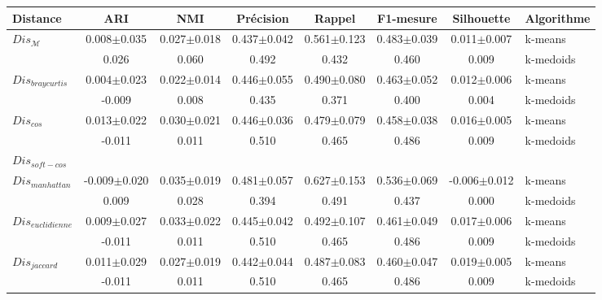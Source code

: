 \begin{table}[!htb]
	\scriptsize\centering
	\begin{tabular}{|l||c|c||c|c|c||c||l|}
		\hline
		Distance & ARI & NMI & Précision & Rappel & F1-mesure & Silhouette & Algorithme\\ \hline
		
		\multirow{2}{*}{$Dis_\mathcal{M}$} & 0.008$\pm$0.035 & 0.027$\pm$0.018 & 0.437$\pm$0.042 & 0.561$\pm$0.123 & 0.483$\pm$0.039 & 0.011$\pm$0.007 & k-means \\
		& 0.026 & 0.060 & 0.492 & 0.432 & 0.460 & 0.009 & k-medoids \\ \hline
		
		
		\multirow{2}{*}{$Dis_{braycurtis}$} & 0.004$\pm$0.023 & 0.022$\pm$0.014 & 0.446$\pm$0.055 & 0.490$\pm$0.080 & 0.463$\pm$0.052 & 0.012$\pm$0.006 & k-means \\
		 & -0.009 & 0.008 & 0.435 & 0.371 & 0.400 & 0.004 & k-medoids \\ \hline
		
		\multirow{2}{*}{$Dis_{cos}$} & 0.013$\pm$0.022 & 0.030$\pm$0.021 & 0.446$\pm$0.036 & 0.479$\pm$0.079 & 0.458$\pm$0.038 & 0.016$\pm$0.005 & k-means \\
		& -0.011 & 0.011 & 0.510 & 0.465 & 0.486 & 0.009 & k-medoids \\ \hline
		
		\multirow{2}{*}{$Dis_{soft-cos}$}  &&&&&&&  \\  
		 &&&&&&&  \\ \hline  		
		
		\multirow{2}{*}{$Dis_{manhattan}$} & -0.009$\pm$0.020 & 0.035$\pm$0.019 & 0.481$\pm$0.057 & 0.627$\pm$0.153 & 0.536$\pm$0.069 & -0.006$\pm$0.012 & k-means \\
		& 0.009 & 0.028 & 0.394 & 0.491 & 0.437 & 0.000 & k-medoids \\ \hline
		
		\multirow{2}{*}{$Dis_{euclidienne}$} & 0.009$\pm$0.027 & 0.033$\pm$0.022 & 0.445$\pm$0.042 & 0.492$\pm$0.107 & 0.461$\pm$0.049 & 0.017$\pm$0.006 & k-means \\
		& -0.011 & 0.011 & 0.510 & 0.465 & 0.486 & 0.009 & k-medoids \\ \hline
		
		\multirow{2}{*}{$Dis_{jaccard}$} & 0.011$\pm$0.029 & 0.027$\pm$0.019 & 0.442$\pm$0.044 & 0.487$\pm$0.083 & 0.460$\pm$0.047 & 0.019$\pm$0.005 & k-means \\
		& -0.011 & 0.011 & 0.510 & 0.465 & 0.486 & 0.009 & k-medoids \\ \hline
		

\end{tabular}
\end{table}

